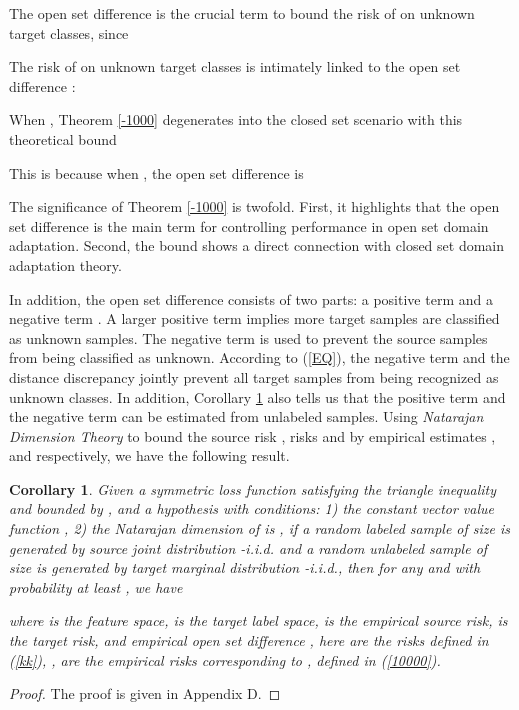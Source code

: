 \documentclass[journal]{IEEEtran}
\newtheorem{corollary}{Corollary}[theorem]
\begin{document}
 
 
 
  The open set difference  is the crucial term to bound the risk of  on unknown target classes, since

The risk of  on unknown target classes is intimately linked to the open set difference :

When , {Theorem \ref{-1000}} degenerates into the  closed set scenario with this theoretical bound \cite{DBLP:conf/nips/Ben-DavidBCP06}

This is because when , the open set difference is
 
The significance of {Theorem \ref{-1000}} is twofold. First, it highlights that the open set difference   is the main term for controlling performance in open set domain adaptation. Second, the bound shows a direct connection with closed set domain adaptation theory. 

In addition, the open set difference  consists of two parts: a positive term  and a negative term . A larger positive term implies more target samples are classified as unknown samples. The negative term is used to prevent the source samples from being classified as unknown. According to (\ref{EQ}),
  the negative term and the distance discrepancy jointly prevent all target samples from being recognized as unknown classes.  In addition, {Corollary \ref{0.1}} also tells us that the positive term and the negative term can be estimated from unlabeled samples. Using \textit{Natarajan Dimension Theory} \cite{DBLP:books/mk/Natarajan91} to bound the source risk , risks  and  by empirical estimates ,  and  respectively, we have the following result.
\begin{corollary}\label{0.1}
Given a symmetric loss function  satisfying the triangle inequality and bounded by , and a hypothesis   with conditions: 1) the constant vector value function , 2) the Natarajan dimension of  is , if a random labeled sample of size  is generated by  source joint distribution -i.i.d. and a random unlabeled sample of size  is generated by target marginal distribution -i.i.d., then for any  and  with probability at least , we have

where  is the feature space,  is the target label space,  is the empirical source risk,  is the target risk,  and empirical open set difference  , here  are the risks defined in (\ref{kk}), ,  are the empirical risks corresponding to ,  defined in (\ref{10000}).
\end{corollary}
\begin{proof}
The proof is given in Appendix D.
\end{proof}
\end{document}
